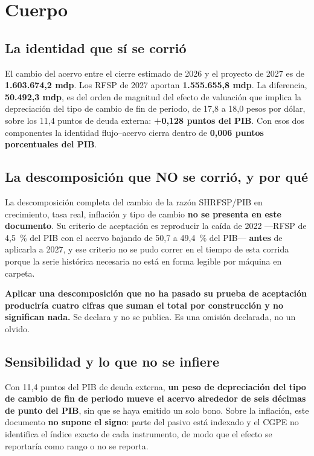 \section{Cuerpo}

\subsection*{La identidad que sí se corrió}

El cambio del acervo entre el cierre estimado de 2026 y el proyecto de 2027 es de
\textbf{1.603.674,2 mdp}. Los RFSP de 2027 aportan \textbf{1.555.655,8 mdp}. La diferencia,
\textbf{50.492,3 mdp}, es del orden de magnitud del efecto de valuación que implica la
depreciación del tipo de cambio de fin de periodo, de 17,8 a 18,0 pesos por dólar, sobre los
11,4 puntos de deuda externa: \textbf{+0,128 puntos del PIB}. Con esos dos componentes la
identidad flujo--acervo cierra dentro de \textbf{0,006 puntos porcentuales del PIB}.

\subsection*{La descomposición que NO se corrió, y por qué}

La descomposición completa del cambio de la razón SHRFSP/PIB en crecimiento, tasa real,
inflación y tipo de cambio \textbf{no se presenta en este documento}. Su criterio de
aceptación es reproducir la caída de 2022 ---RFSP de 4,5~\% del PIB con el acervo bajando de
50,7 a 49,4~\% del PIB--- \textbf{antes} de aplicarla a 2027, y ese criterio no se pudo
correr en el tiempo de esta corrida porque la serie histórica necesaria no está en forma
legible por máquina en carpeta.

\textbf{Aplicar una descomposición que no ha pasado su prueba de aceptación produciría
cuatro cifras que suman el total por construcción y no significan nada.} Se declara y no se
publica. Es una omisión declarada, no un olvido.

\subsection*{Sensibilidad y lo que no se infiere}

Con 11,4 puntos del PIB de deuda externa, \textbf{un peso de depreciación del tipo de cambio
de fin de periodo mueve el acervo alrededor de seis décimas de punto del PIB}, sin que se
haya emitido un solo bono. Sobre la inflación, este documento \textbf{no supone el signo}:
parte del pasivo está indexado y el CGPE no identifica el índice exacto de cada instrumento,
de modo que el efecto se reportaría como rango o no se reporta.

